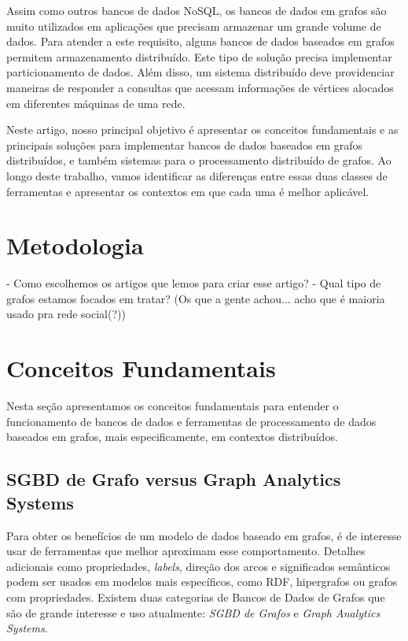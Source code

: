 \documentclass[conference]{IEEEtran}
\begin{document}
Assim como outros bancos de dados NoSQL, os bancos de dados em grafos
são muito utilizados em aplicações que precisam armazenar um grande
volume de dados. Para atender a este requisito, alguns bancos de dados
baseados em grafos permitem armazenamento distribuído. Este tipo de
solução precisa implementar particionamento de dados. Além disso, um
sistema distribuído deve providenciar maneiras de responder a consultas
que acessam informações de vértices alocados em diferentes máquinas de
uma rede.

Neste artigo, nosso principal objetivo é apresentar os conceitos
fundamentais e as principais soluções para implementar bancos de dados
baseados em grafos distribuídos, e também sistemas para o processamento
distribuído de grafos. Ao longo deste trabalho, vamos identificar as diferenças
entre essas duas classes de ferramentas e apresentar os contextos em que cada
uma é melhor aplicável.

\section{Metodologia}
- Como escolhemos os artigos que lemos para criar esse artigo?
- Qual tipo de grafos estamos focados em tratar? (Os que a gente achou...
acho que é maioria usado pra rede social(?))

\section{Conceitos Fundamentais}
Nesta seção apresentamos os conceitos fundamentais para entender o
funcionamento de bancos de dados e ferramentas de processamento de dados
baseados em grafos, mais especificamente, em contextos distribuídos.

\subsection{SGBD de Grafo versus Graph Analytics Systems}

Para obter os benefícios de um modelo de dados baseado em grafos, é de
interesse usar de ferramentas que melhor aproximam esse comportamento. Detalhes
adicionais como propriedades, \emph{labels}, direção dos arcos e significados
semânticos podem ser usados em modelos mais específicos, como RDF, hipergrafos
ou grafos com propriedades. Existem duas categorias de Bancos de Dados de
Grafos que são de grande interesse e uso atualmente:
\emph{SGBD de Grafos} e \emph{Graph Analytics Systems}.
\end{document}
